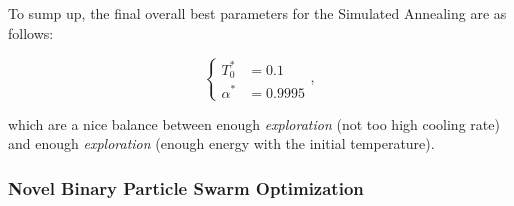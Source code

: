 \documentclass[12pt, openany]{article}
\begin{document}
\begin{table}[H]
    \centering
    \renewcommand{\arraystretch}{1.3}
    \caption{\textbf{Summary of statistical significance tests for the SA annealing schedules ($k=12$ configurations).} Statistically significant $p$-values ($<0.05$) are highlighted in bold. The Critical Difference (CD) is the threshold for Nemenyi pairwise significance; with $k=12$ treatments and few blocks the CD is large, so no pair is individually separable despite the significant global/$k-$NN omnibus tests.}
    \label{tab:statistical_tests_sa}
\end{table}

To sump up, the final overall best parameters for the Simulated Annealing are as follows:

$$
\boxed{
\begin{cases}
    T_0^* &= 0.1\\
    \alpha^* & =0.9995
\end{cases}
},
$$

which are a nice balance between enough \emph{exploration} (not too high cooling rate) and enough \emph{exploration} (enough energy with the initial temperature).

\subsubsection{Novel Binary Particle Swarm Optimization}\label{sec:NBPSO_parameters}
\end{document}
